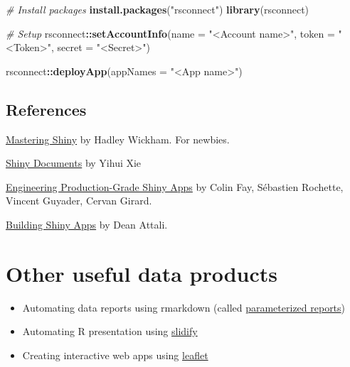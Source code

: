 \documentclass[
]{book}
\newenvironment{Shaded}{\begin{snugshade}}{\end{snugshade}}
\newcommand{\AttributeTok}[1]{\textcolor[rgb]{0.13,0.29,0.53}{#1}}
\newcommand{\CommentTok}[1]{\textcolor[rgb]{0.56,0.35,0.01}{\textit{#1}}}
\newcommand{\FunctionTok}[1]{\textcolor[rgb]{0.13,0.29,0.53}{\textbf{#1}}}
\newcommand{\NormalTok}[1]{#1}
\newcommand{\SpecialCharTok}[1]{\textcolor[rgb]{0.81,0.36,0.00}{\textbf{#1}}}
\newcommand{\StringTok}[1]{\textcolor[rgb]{0.31,0.60,0.02}{#1}}
\providecommand{\tightlist}{%
  \setlength{\itemsep}{0pt}\setlength{\parskip}{0pt}}
\begin{document}
\begin{Shaded}
\begin{Highlighting}[]
\CommentTok{\# Install packages }
\FunctionTok{install.packages}\NormalTok{(}\StringTok{"rsconnect"}\NormalTok{)}
\FunctionTok{library}\NormalTok{(rsconnect)}

\CommentTok{\# Setup }
\NormalTok{rsconnect}\SpecialCharTok{::}\FunctionTok{setAccountInfo}\NormalTok{(}\AttributeTok{name =} \StringTok{"\textless{}Account name\textgreater{}"}\NormalTok{, }
                          \AttributeTok{token =} \StringTok{"\textless{}Token\textgreater{}"}\NormalTok{,}
                          \AttributeTok{secret =} \StringTok{"\textless{}Secret\textgreater{}"}\NormalTok{)}

\NormalTok{rsconnect}\SpecialCharTok{::}\FunctionTok{deployApp}\NormalTok{(}\AttributeTok{appNames =} \StringTok{"\textless{}App name\textgreater{}"}\NormalTok{)}
\end{Highlighting}
\end{Shaded}

\subsection{References}\label{references-3}

\href{https://mastering-shiny.org/}{Mastering Shiny} by Hadley Wickham. For newbies.

\href{https://bookdown.org/yihui/rmarkdown/shiny-documents.html}{Shiny Documents} by Yihui Xie

\href{https://engineering-shiny.org/}{Engineering Production-Grade Shiny Apps} by Colin Fay, Sébastien Rochette, Vincent Guyader, Cervan Girard.

\href{https://stat545.com/shiny-tutorial.html}{Building Shiny Apps} by Dean Attali.

\section{Other useful data products}\label{other-useful-data-products}

\begin{itemize}
\tightlist
\item
  Automating data reports using rmarkdown (called \href{https://rmarkdown.rstudio.com/developer_parameterized_reports.html\%23parameter_types\%2F}{parameterized reports})
\item
  Automating R presentation using \href{http://slidify.org/index.html}{slidify}
\item
  Creating interactive web apps using \href{https://rstudio.github.io/leaflet/}{leaflet}
\end{itemize}
\end{document}
